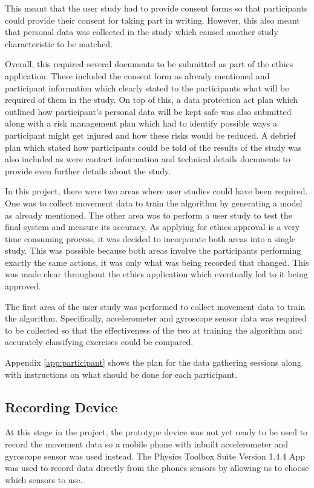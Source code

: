 This meant that the user study had to provide consent forms so that participants could provide their consent for taking part in writing. However, this also meant that personal data was collected in the study which caused another study characteristic to be matched.

Overall, this required several documents to be submitted as part of the ethics application. These included the consent form as already mentioned and participant information which clearly stated to the participants what will be required of them in the study. On top of this, a data protection act plan which outlined how participant's personal data will be kept safe was also submitted along with a risk management plan which had to identify possible ways a participant might get injured and how these risks would be reduced. A debrief plan which stated how participants could be told of the results of the study was also included as were contact information and technical details documents to provide even further details about the study.

In this project, there were two areas where user studies could have been required. One was to collect movement data to train the algorithm by generating a model as already mentioned. The other area was to perform a user study to test the final system and measure its accuracy. As applying for ethics approval is a very time consuming process, it was decided to incorporate both areas into a single study. This was possible because both areas involve the participants performing exactly the same actions, it was only what was being recorded that changed. This was made clear throughout the ethics application which eventually led to it being approved.

The first area of the user study was performed to collect movement data to train the algorithm. Specifically, accelerometer and gyroscope sensor data was required to be collected so that the effectiveness of the two at training the algorithm and accurately classifying exercises could be compared.

Appendix \ref{app:participant} shows the plan for the data gathering sessions along with instructions on what should be done for each participant.

\subsection{Recording Device}
At this stage in the project, the prototype device was not yet ready to be used to record the movement data so a mobile phone with inbuilt accelerometer and gyroscope sensor was used instead. The Physics Toolbox Suite Version 1.4.4 App \cite{vieyra2016} was used to record data directly from the phones sensors by allowing us to choose which sensors to use.

